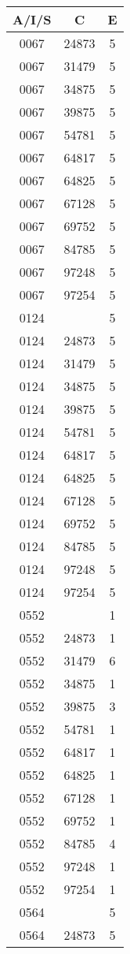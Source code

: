 {{\begin{tabular}{|c|c||c|}
        \hline
        \end{tabular}
        \quad
        \begin{tabular}{|c|c||c|}
        \hline
        \bf A/I/S & \bf C & \bf E \\
        \hline
0067&24873&5\\ 0067&31479&5\\ 0067&34875&5\\ 0067&39875&5\\ 0067&54781&5\\ 0067&64817&5\\ 0067&64825&5\\ 0067&67128&5\\ 0067&69752&5\\ 0067&84785&5\\ 0067&97248&5\\ 0067&97254&5\\ 0124& &5\\ 0124&24873&5\\ 0124&31479&5\\ 0124&34875&5\\ 0124&39875&5\\ 0124&54781&5\\ 0124&64817&5\\ 0124&64825&5\\ 0124&67128&5\\ 0124&69752&5\\ 0124&84785&5\\ 0124&97248&5\\ 0124&97254&5\\ 0552& &1\\ 0552&24873&1\\ 0552&31479&6\\ 0552&34875&1\\ 0552&39875&3\\ 0552&54781&1\\ 0552&64817&1\\ 0552&64825&1\\ 0552&67128&1\\ 0552&69752&1\\ 0552&84785&4\\ 0552&97248&1\\ 0552&97254&1\\ 0564& &5\\ 0564&24873&5\\ 
        \hline
        \end{tabular}
        \quad
        \begin{tabular}{|c|c||c|}

\end{tabular}}}
